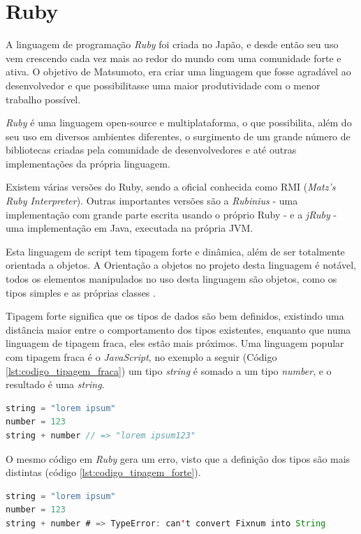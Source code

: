 \section{Ruby}

A linguagem de programação \textit{Ruby} \cite{RUBY} foi criada no Japão, e desde então seu uso vem crescendo cada vez mais ao redor do mundo com uma comunidade forte e ativa. O objetivo de Matsumoto, era criar uma linguagem que fosse agradável ao desenvolvedor e que possibilitasse uma maior produtividade com o menor trabalho possível.

\textit{Ruby} é uma linguagem open-source e multiplataforma, o que possibilita, além do seu uso em diversos ambientes diferentes, o surgimento de um grande número de bibliotecas criadas pela comunidade de desenvolvedores e até outras implementações da própria linguagem.

Existem várias versões do Ruby, sendo a oficial conhecida como RMI (\textit{Matz’s Ruby Interpreter}). Outras importantes versões são a \textit{Rubinius} \cite{RUBINIUS} - uma implementação com grande parte escrita usando o próprio Ruby -  e a \textit{jRuby} \cite{JRUBY} - uma implementação em Java, executada na própria JVM.

Esta linguagem de script tem tipagem forte e dinâmica, além de ser totalmente orientada a objetos.  A Orientação a objetos no projeto desta linguagem é notável, todos os elementos manipulados no uso desta linguagem são objetos, como os tipos simples e as próprias classes \cite{THOMAS}.

Tipagem forte significa que os tipos de dados são bem definidos, existindo uma distância maior entre o comportamento dos tipos existentes, enquanto que numa linguagem de tipagem fraca, eles estão mais próximos. Uma linguagem popular com tipagem fraca é o \textit{JavaScript}, no exemplo a seguir (Código \ref{lst:codigo_tipagem_fraca}) um tipo \textit{string} é somado a um tipo \textit{number}, e o resultado é uma \textit{string}.

{\singlespace
\begin{lstlisting}[caption=Tipagem fraca no \textit{JavaScript}, language=Java, label={lst:codigo_tipagem_fraca}]
string = "lorem ipsum"
number = 123
string + number // => "lorem ipsum123"
\end{lstlisting}
}

O mesmo código em \textit{Ruby} gera um erro, visto que a definição dos tipos são mais distintas (código \ref{lst:codigo_tipagem_forte}).

{\singlespace
\begin{lstlisting}[caption=Tipagem forte no \textit{Ruby}, language=Java, label={lst:codigo_tipagem_forte}]
string = "lorem ipsum"
number = 123
string + number # => TypeError: can't convert Fixnum into String
\end{lstlisting}
}

